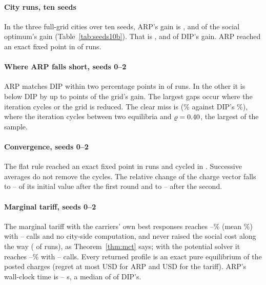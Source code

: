 \documentclass[preprint,12pt]{elsarticle}
\theoremstyle{definition}
\theoremstyle{remark}
\begin{document}
\paragraph{City runs, ten seeds} In the three full-grid cities over ten seeds, ARP's gain is \TenSoArpNewDelhi, \TenSoArpBuenosAires{} and \TenSoArpLondon{} of the social optimum's gain (Table~\ref{tab:seeds10b}). That is \TenArpDipNewDelhi, \TenArpDipBuenosAires{} and \TenArpDipLondon{} of DIP's gain. ARP reached an exact fixed point in \TenArpFixedN{} of \TenArpRuns{} runs.

\paragraph{Where ARP falls short, seeds 0--2} ARP matches DIP within two percentage points in \ArpEqualsDipN{} of \ArpRuns{} runs. In the other \ArpDipGapN{} it is below DIP by up to \ArpDipGapMax{} points of the grid's gain. The largest gaps occur where the iteration cycles or the grid is reduced. The clear miss is \ArpMissCase{} (\ArpMissGain\% against DIP's \ArpMissDip\%), where the iteration cycles between two equilibria and $\varrho=0.40$, the largest of the sample.

\paragraph{Convergence, seeds 0--2} The flat rule reached an exact fixed point in \ArpFixedN{} runs and cycled in \ArpCycleN. Successive averages do not remove the cycles. The relative change of the charge vector falls to \ArpStepAMin--\ArpStepAMax{} of its initial value after the first round and to \ArpStepBMin--\ArpStepBMax{} after the second.

\paragraph{Marginal tariff, seeds 0--2} The marginal tariff with the carriers' own best responses reaches \MctGainMin--\MctGainMax\% (mean \MctGainMean\%) with \MctCallsMin--\MctCallsMax{} calls and no city-side computation, and never raised the social cost along the way (\MctMonotoneN{} of \ArpRuns{} runs), as Theorem~\ref{thm:mct} says; with the potential solver it reaches \MctSoGainMin--\MctSoGainMax\% with \MctSoCallsMin--\MctSoCallsMax{} calls. Every returned profile is an exact pure equilibrium of the posted charges (regret at most \ArpRegretMax{} USD for ARP and \MctRegretMax{} USD for the tariff). ARP's wall-clock time is \ArpTimeMin--\ArpTimeMax{} s, a median of \ArpTimeRatioMed{} of DIP's.
\end{document}
